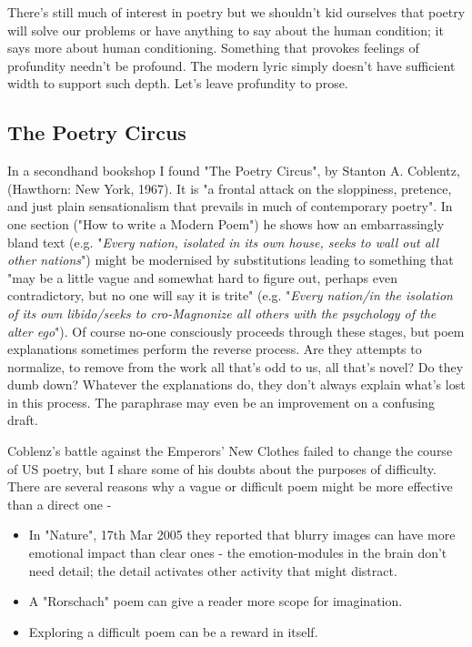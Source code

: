 \documentclass[11pt]{article}
\begin{document}
There's still much of interest in poetry but we shouldn't kid ourselves that poetry will solve our problems or have anything to say about the human condition; it says more about human conditioning. Something that provokes feelings of profundity needn't be profound. The modern lyric simply doesn't have sufficient width to support such depth. Let's leave profundity to prose.


\newpage\subsection{The Poetry Circus}

In a secondhand bookshop I found "The Poetry Circus", by Stanton A. Coblentz, (Hawthorn: New York, 1967). It is "a frontal attack on the sloppiness, pretence,  and just plain sensationalism that prevails in much of contemporary poetry". In one section ("How to write a Modern Poem") he shows how an embarrassingly bland text (e.g. "\textit{Every nation, isolated in its own house, seeks to wall out all other nations}")
might be modernised by substitutions leading to something that "may be a little vague and somewhat hard to figure out, perhaps even contradictory, but no one will say it is trite" (e.g. "\textit{Every nation/in the isolation of its own libido/seeks to cro-Magnonize all others with the psychology of the alter ego}"). Of course no-one consciously proceeds through these stages, but poem explanations sometimes perform the reverse process. Are they attempts to normalize, to remove from the work all that's odd to us, all that's novel?  Do they dumb down? Whatever the explanations do, they don't always explain what's lost in this process. The paraphrase may even be an improvement on a confusing draft.

Coblenz's battle against the Emperors' New Clothes failed to change the course of US poetry, but I share some of his doubts about the purposes of difficulty. There are several reasons why a vague or difficult poem might be more effective than a direct one -
\begin{itemize}
\item  In "Nature", 17th Mar 2005 they reported that blurry images can have more emotional impact than clear ones - the emotion-modules in the brain don't need detail; the detail activates other activity that might distract.
\item  A "Rorschach" poem can give a reader more scope for imagination.
\item  Exploring a difficult poem can be a reward in itself.
\end{itemize}
\end{document}
